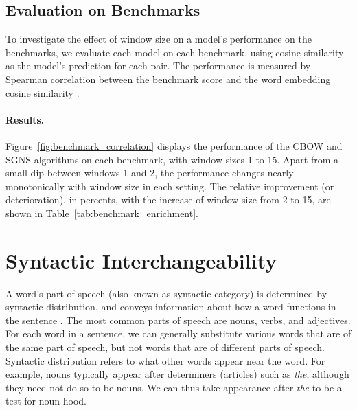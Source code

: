\documentclass[11pt,a4paper]{article}
\begin{document}
    \subsection{Evaluation on Benchmarks}\label{sec:eval_exp}
    
    To investigate the effect of window size on a model's performance on the benchmarks,
    we evaluate each model on each benchmark, using cosine similarity
    as the model's prediction for each pair.
    The performance is measured by Spearman correlation between the benchmark score
    and the word embedding cosine similarity \cite{levy2015improving}.
    
    \paragraph{Results.}
    
    Figure~\ref{fig:benchmark_correlation} displays the performance of the CBOW and SGNS
    algorithms on each benchmark, with window sizes 1 to 15.
    Apart from a small dip between windows 1 and 2,
    the performance changes nearly monotonically with window size in each
    setting.
    The relative improvement (or deterioration),
    in percents, with the increase of window size from 2 to 15,
    are shown in Table~\ref{tab:benchmark_enrichment}.
    
    
    \section{Syntactic Interchangeability}\label{sec:interchangeability}
    
    A word's part of speech (also known as syntactic category)
    is determined by syntactic distribution, and
    conveys information about how a word functions in the sentence \cite{carnie2002syntax}.
    The most common parts of speech are nouns, verbs, and adjectives.
    For each word in a sentence,
    we can generally substitute various words that are of the same part of speech,
    but not words that are of different parts of speech.
    Syntactic distribution refers to what other words appear
    near the word. For example, nouns typically appear after determiners (articles)
    such as \textit{the}, although they need not do so to be nouns. We can thus
    take appearance after \textit{the} to be a test for noun-hood.
    
\end{document}
